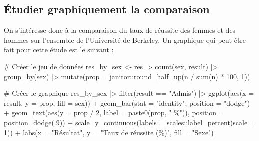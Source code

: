 \documentclass[
  letterpaper,
]{book}
\newenvironment{Shaded}{\begin{snugshade}}{\end{snugshade}}
\newcommand{\AttributeTok}[1]{\textcolor[rgb]{0.40,0.45,0.13}{#1}}
\newcommand{\CommentTok}[1]{\textcolor[rgb]{0.37,0.37,0.37}{#1}}
\newcommand{\DecValTok}[1]{\textcolor[rgb]{0.68,0.00,0.00}{#1}}
\newcommand{\FunctionTok}[1]{\textcolor[rgb]{0.28,0.35,0.67}{#1}}
\newcommand{\NormalTok}[1]{\textcolor[rgb]{0.00,0.23,0.31}{#1}}
\newcommand{\OtherTok}[1]{\textcolor[rgb]{0.00,0.23,0.31}{#1}}
\newcommand{\SpecialCharTok}[1]{\textcolor[rgb]{0.37,0.37,0.37}{#1}}
\newcommand{\StringTok}[1]{\textcolor[rgb]{0.13,0.47,0.30}{#1}}
\begin{document}
\subsection{Étudier graphiquement la
comparaison}\label{uxe9tudier-graphiquement-la-comparaison-2}

On s'intéresse donc à la comparaison du taux de réussite des femmes et
des hommes sur l'ensemble de l'Université de Berkeley. Un graphique qui
peut être fait pour cette étude est le suivant :

\begin{Shaded}
\begin{Highlighting}[]
\CommentTok{\# Créer le jeu de données}
\NormalTok{res\_by\_sex }\OtherTok{\textless{}{-}}
\NormalTok{  res }\SpecialCharTok{|\textgreater{}} 
  \FunctionTok{count}\NormalTok{(sex, result) }\SpecialCharTok{|\textgreater{}} 
  \FunctionTok{group\_by}\NormalTok{(sex) }\SpecialCharTok{|\textgreater{}} 
  \FunctionTok{mutate}\NormalTok{(}\AttributeTok{prop =}\NormalTok{ janitor}\SpecialCharTok{::}\FunctionTok{round\_half\_up}\NormalTok{(n }\SpecialCharTok{/} \FunctionTok{sum}\NormalTok{(n) }\SpecialCharTok{*} \DecValTok{100}\NormalTok{, }\DecValTok{1}\NormalTok{)) }

\CommentTok{\# Créer le graphique}
\NormalTok{res\_by\_sex }\SpecialCharTok{|\textgreater{}} 
  \FunctionTok{filter}\NormalTok{(result }\SpecialCharTok{==} \StringTok{"Admis"}\NormalTok{) }\SpecialCharTok{|\textgreater{}} 
  \FunctionTok{ggplot}\NormalTok{(}\FunctionTok{aes}\NormalTok{(}\AttributeTok{x =}\NormalTok{ result, }\AttributeTok{y =}\NormalTok{ prop, }\AttributeTok{fill =}\NormalTok{ sex)) }\SpecialCharTok{+}
  \FunctionTok{geom\_bar}\NormalTok{(}\AttributeTok{stat =} \StringTok{"identity"}\NormalTok{, }\AttributeTok{position =} \StringTok{"dodge"}\NormalTok{) }\SpecialCharTok{+}
  \FunctionTok{geom\_text}\NormalTok{(}\FunctionTok{aes}\NormalTok{(}\AttributeTok{y =}\NormalTok{ prop }\SpecialCharTok{/} \DecValTok{2}\NormalTok{, }\AttributeTok{label =} \FunctionTok{paste0}\NormalTok{(prop, }\StringTok{" \%"}\NormalTok{)), }\AttributeTok{position =} \FunctionTok{position\_dodge}\NormalTok{(.}\DecValTok{9}\NormalTok{)) }\SpecialCharTok{+}
  \FunctionTok{scale\_y\_continuous}\NormalTok{(}\AttributeTok{labels =}\NormalTok{ scales}\SpecialCharTok{::}\FunctionTok{label\_percent}\NormalTok{(}\AttributeTok{scale =} \DecValTok{1}\NormalTok{)) }\SpecialCharTok{+}
  \FunctionTok{labs}\NormalTok{(}\AttributeTok{x =} \StringTok{"Résultat"}\NormalTok{, }\AttributeTok{y =} \StringTok{"Taux de réussite (\%)"}\NormalTok{, }\AttributeTok{fill =} \StringTok{"Sexe"}\NormalTok{)}
\end{Highlighting}
\end{Shaded}
\end{document}
